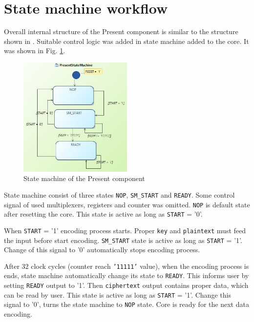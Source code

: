 \documentclass{gajewski}
\begin{document}
\newpage

\section{State machine workflow}

Overall internal structure of the Present component is similar to the structure shown in \cite{PRESENT}. Suitable control logic was added in state machine added
to the core. It was shown in Fig. \ref{presentSM}.

\begin{figure}[!ht]%
    \begin{center}
    \includegraphics[width=0.5\textwidth]{img/SM.jpg}
    \caption{%
        State machine of the Present component
     }%
    \label{presentSM}
    \end{center}
 \end{figure}

State machine consist of three states \texttt{NOP}, \texttt{SM\_START} and \texttt{READY}. Some control signal of used multiplexers, registers and counter was omitted. \texttt{NOP} is default state after resetting the core. This state is active as long as \texttt{START} = '0'.

When \texttt{START} = '1' encoding process starts. Proper \texttt{key} and \texttt{plaintext} must feed the input before start encoding. \texttt{SM\_START} state is active as long as \texttt{START} = '1'. Change of this signal to '0' automatically stops encoding process. 

After 32 clock cycles (counter reach \texttt{'11111'} value), when the encoding process is ends, state machine automatically change its state to \texttt{READY}. This informs user by setting \texttt{READY} output to '1'. Then \texttt{ciphertext} output contains proper data, which can be read by user. This state is active as long as \texttt{START} = '1'. Change this signal to '0', turns the state machine to \texttt{NOP} state. Core is ready for the next data encoding.
\end{document}
